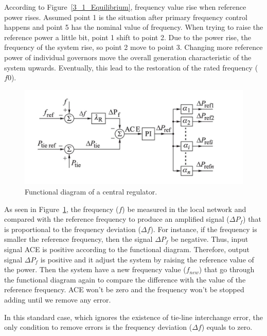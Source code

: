 According to Figure~\ref{3_1_Equilibrium}, frequency value rise when reference power rises. Assumed point 1 is the situation after primary frequency control happens and point 5 has the nominal value of frequency. When trying to raise the reference power a little bit, point 1 shift to point 2. Due to the power rise, the frequency of the system rise, so point 2 move to point 3. Changing more reference power of individual governors move the overall generation characteristic of the system upwards. Eventually, this lead to the restoration of the rated frequency ($f0$). 

\begin{figure}[t]
\center
\includegraphics[scale=0.42]{figure/3_1_Functional.png}
\caption{Functional diagram of a central regulator.}
\label{3_1_Functional}
\end{figure}

As seen in Figure~\ref{3_1_Functional}, the frequency ($f$) be measured in the local network and compared with the reference frequency to produce an amplified signal ($\Delta P_f$) that is proportional to the frequency deviation ($\Delta f$). For instance, if the frequency is smaller the reference frequency, then the signal $\Delta P_f$ be negative. Thus, input signal ACE is positive according to the functional diagram. Therefore, output signal $\Delta P_f$ is positive and it adjust the system by raising the reference value of the power. Then the system have a new frequency value ($f_{n e w}$) that go through the functional diagram again to compare the difference with the value of the reference frequency. ACE won’t be zero and the frequency won’t be stopped adding until we remove any error. 

In this standard case, which ignores the existence of tie-line interchange error, the only condition to remove errors is the frequency deviation ($\Delta f$) equals to zero. 

